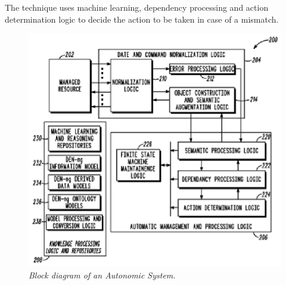 The technique uses machine learning, dependency processing and action determination logic to decide the action to be taken in case of a mismatch.
	\begin{figure}[h]
		\begin{center}
			\includegraphics{figures/patent1_2.eps} 
			\caption{\small \sl Block diagram of an Autonomic System.\label{fig:Label2}} 
		\end{center} 
	\end{figure}
